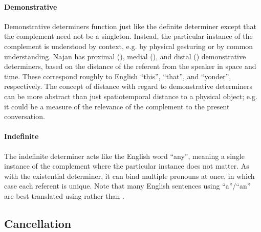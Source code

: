 \paragraph{Demonstrative} Demonstrative determiners function just like the
definite determiner except that the complement need not be a singleton. Instead,
the particular instance of the complement is understood by context, e.g. by
physical gesturing or by common understanding. Najan has proximal
(), medial (), and distal () demonstrative
determiners, based on the distance of the referent from the speaker in space and
time. These correspond roughly to English ``this'', ``that'', and ``yonder'',
respectively. The concept of distance with regard to demonstrative determiners
can be more abstract than just spatiotemporal distance to a physical object;
e.g. it could be a measure of the relevance of the complement to the present
conversation.

\paragraph{Indefinite} The indefinite determiner  acts like the
English word ``any'', meaning a single instance of the complement where the
particular instance does not matter. As with the existential determiner, it can
bind multiple pronouns at once, in which case each referent is unique. Note that
many English sentences using ``a''/``an'' are best translated using 
rather than .




\subsection{Cancellation} \label{sec:cancellation}

